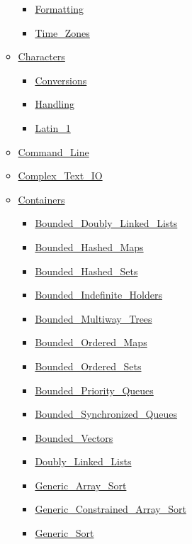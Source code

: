 \begin{multicols*}{\columnnr}
\begin{scriptsize}
\begin{itemize}[leftmargin=0mm]
\begin{itemize}[leftmargin=5mm]
\begin{itemize}[leftmargin=5mm]
	\item[] \href{\adarmlink{RM-9-6-1.html}}{Formatting}
	\item[] \href{\adarmlink{RM-9-6-1.html}}{Time\_Zones}
	\end{itemize}
  \item[] \href{\adarmlink{RM-A-3-1.html}}{Characters}
	\begin{itemize}[leftmargin=5mm]
	\item[] \href{\adarmlink{RM-A-3-4.html}}{Conversions}
	\item[] \href{\adarmlink{RM-A-3-2.html}}{Handling}
	\item[] \href{\adarmlink{RM-A-3-3.html}}{Latin\_1}
	\end{itemize}
  \item[] \href{\adarmlink{RM-A-15.html}}{Command\_Line}
  \item[] \href{\adarmlink{RM-G-1-3.html}}{Complex\_Text\_IO}
  \item[] \href{\adarmlink{RM-A-18-1.html}}{Containers}
	\begin{itemize}[leftmargin=5mm]
	\item[] \href{\adarmlink{RM-A-18-20.html}}{Bounded\_Doubly\_Linked\_Lists}
	\item[] \href{\adarmlink{RM-A-18-21.html}}{Bounded\_Hashed\_Maps}
	\item[] \href{\adarmlink{RM-A-18-23.html}}{Bounded\_Hashed\_Sets}
	\item[] \href{\adarmlink{RM-A-18-32.html}}{Bounded\_Indefinite\_Holders}
	\item[] \href{\adarmlink{RM-A-18-25.html}}{Bounded\_Multiway\_Trees}
	\item[] \href{\adarmlink{RM-A-18-22.html}}{Bounded\_Ordered\_Maps}
	\item[] \href{\adarmlink{RM-A-18-24.html}}{Bounded\_Ordered\_Sets}
	\item[] \href{\adarmlink{RM-A-18-31.html}}{Bounded\_Priority\_Queues}
	\item[] \href{\adarmlink{RM-A-18-29.html}}{Bounded\_Synchronized\_Queues}
	\item[] \href{\adarmlink{RM-A-18-19.html}}{Bounded\_Vectors}
	\item[] \href{\adarmlink{RM-A-18-3.html}}{Doubly\_Linked\_Lists}
	\item[] \href{\adarmlink{RM-A-18-26.html}}{Generic\_Array\_Sort}
	\item[] \href{\adarmlink{RM-A-18-26.html}}{Generic\_Constrained\_Array\_Sort}
	\item[] \href{\adarmlink{RM-A-18-26.html}}{Generic\_Sort}

\end{itemize}
\end{itemize}
\end{itemize}
\end{scriptsize}
\end{multicols*}
